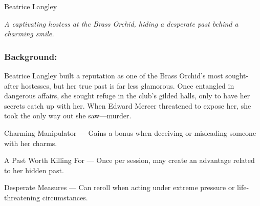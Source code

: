 \begin{WyrdFullNPC}[%
    name=Beatrice Langley,%
    description=The Orchid’s Most Enchanting Hostess,%
    float=!t%
  ]{Beatrice Langley}
  
    \emph{A captivating hostess at the Brass Orchid, hiding a desperate past behind a charming smile.}
  
    \subsubsection*{Background:}
    Beatrice Langley built a reputation as one of the Brass Orchid’s most sought-after hostesses, but her true past is far less glamorous. Once entangled in dangerous affairs, she sought refuge in the club’s gilded halls, only to have her secrets catch up with her. When Edward Mercer threatened to expose her, she took the only way out she saw—murder.
  
    \vspace{0.5\baselineskip}
    \SkillsBox[%
      expert={Deception},%
      skilled={Stealth, Persuasion},%
      novice={Awareness, Empathy, Etiquette}%
    ]
  
    \begin{TraitsBox}
      \item[Charming Manipulator] — Gains a bonus when deceiving or misleading someone with her charms.
      \item[A Past Worth Killing For] — Once per session, may create an advantage related to her hidden past.
      \item[Desperate Measures] — Can reroll when acting under extreme pressure or life-threatening circumstances.
    \end{TraitsBox}
  
  \end{WyrdFullNPC}
  